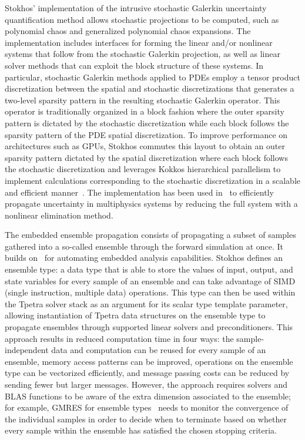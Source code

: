 Stokhos' implementation of the intrusive stochastic Galerkin uncertainty quantification method allows stochastic projections to be computed, such as polynomial chaos and generalized polynomial chaos expansions.
The implementation includes interfaces for forming the linear and/or nonlinear systems that follow from the stochastic Galerkin projection, as well as linear solver methods that can exploit the block structure of these systems.
In particular, stochastic Galerkin methods applied to PDEs employ a tensor product discretization between the spatial and stochastic discretizations that generates a two-level sparsity pattern in the resulting stochastic Galerkin operator.  This operator is traditionally organized in a block fashion where the outer sparsity pattern is dictated by the stochastic discretization while each block follows the sparsity pattern of the PDE spatial discretization.  To improve performance on architectures such as GPUs, Stokhos commutes this layout to obtain an outer sparsity pattern dictated by the spatial discretization where each block follows the stochastic discretization and leverages Kokkos hierarchical parallelism to implement calculations corresponding to the stochastic discretization in a scalable and efficient manner~\cite{phipps2014exploring}.
The implementation has been used in~\cite{constantine2014efficient} to efficiently propagate uncertainty in multiphysics systems by reducing the full system with a nonlinear elimination method.

The embedded ensemble propagation consists of propagating a subset of samples gathered into a so-called ensemble through the forward simulation at once.
It builds on~\cite{pawlowski2012automating} for automating embedded analysis capabilities. Stokhos defines an ensemble type: a data type that is able to store
the values of input, output, and state variables for every sample of an ensemble and can take advantage of SIMD (single instruction, multiple data) operations. This type can then be used within the Tpetra solver stack as an argument for its scalar type template parameter, allowing instantiation of Tpetra data structures on the ensemble type to propagate ensembles through supported linear solvers and preconditioners.
This approach results in reduced computation time in four ways: the sample-independent data and computation can be reused for every sample of an ensemble, memory access patterns can be improved,
operations on the ensemble type can be vectorized efficiently, and message passing costs can be reduced by sending fewer but larger messages.
However, the approach requires solvers and BLAS functions to be aware of the extra dimension associated to the ensemble; for example, GMRES for ensemble types~\cite{liegeois2020gmres} needs to monitor
the convergence of the individual samples in order to decide when to terminate based on whether every sample within the ensemble has satisfied the chosen stopping criteria.

